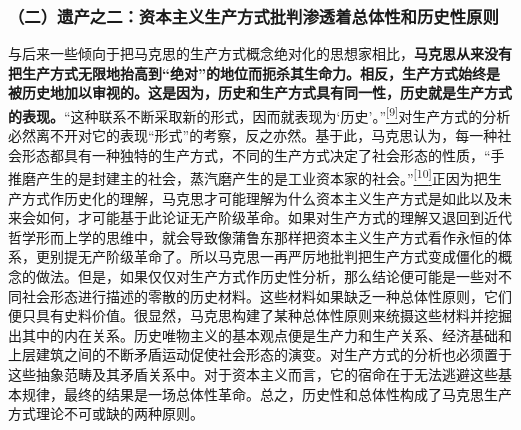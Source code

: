 \documentclass[UTF8, fontset = sourcesans, a4paper, oneside, zihao =
-4, scheme=chinese, no-math, space=true]{ctexbook}
\begin{document}
\subsubsection{（二）遗产之二：资本主义生产方式批判渗透着总体性和历史性原则}\label{part0007_split_001.htmlux5cux23d009}

与后来一些倾向于把马克思的生产方式概念绝对化的思想家相比，\textbf{马克思从来没有把生产方式无限地抬高到``绝对''的地位而扼杀其生命力。相反，生产方式始终是被历史地加以审视的。这是因为，历史和生产方式具有同一性，历史就是生产方式的表现。}``这种联系不断采取新的形式，因而就表现为`历史'。''\protect\hypertarget{part0007_split_001.htmlux5cux23w9}{}{}\protect\hyperlink{part0007_split_004.htmlux5cux23m9}{\textsuperscript{{[}9{]}}}对生产方式的分析必然离不开对它的表现``形式''的考察，反之亦然。基于此，马克思认为，每一种社会形态都具有一种独特的生产方式，不同的生产方式决定了社会形态的性质，``手推磨产生的是封建主的社会，蒸汽磨产生的是工业资本家的社会。''\protect\hypertarget{part0007_split_001.htmlux5cux23w10}{}{}\protect\hyperlink{part0007_split_004.htmlux5cux23m10}{\textsuperscript{{[}10{]}}}正因为把生产方式作历史化的理解，马克思才可能理解为什么资本主义生产方式是如此以及未来会如何，才可能基于此论证无产阶级革命。如果对生产方式的理解又退回到近代哲学形而上学的思维中，就会导致像蒲鲁东那样把资本主义生产方式看作永恒的体系，更别提无产阶级革命了。所以马克思一再严厉地批判把生产方式变成僵化的概念的做法。但是，如果仅仅对生产方式作历史性分析，那么结论便可能是一些对不同社会形态进行描述的零散的历史材料。这些材料如果缺乏一种总体性原则，它们便只具有史料价值。很显然，马克思构建了某种总体性原则来统摄这些材料并挖掘出其中的内在关系。历史唯物主义的基本观点便是生产力和生产关系、经济基础和上层建筑之间的不断矛盾运动促使社会形态的演变。对生产方式的分析也必须置于这些抽象范畴及其矛盾关系中。对于资本主义而言，它的宿命在于无法逃避这些基本规律，最终的结果是一场总体性革命。总之，历史性和总体性构成了马克思生产方式理论不可或缺的两种原则。
\end{document}
